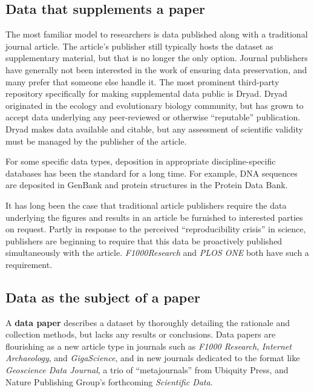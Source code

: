 \documentclass[10pt,a4paper,twocolumn]{article}
\begin{document}
\subsection*{Data that supplements a paper}\label{paper-supplement-data}

The most familiar model to researchers is data published along with a traditional journal article. 
The article's publisher still typically hosts the dataset as supplementary material, but that is no longer the only option.
Journal publishers have generally not been interested in the work of ensuring data preservation, and many prefer that someone else handle it.
The most prominent third-party repository specifically for making supplemental data public is Dryad\cite{dryad}.
Dryad originated in the ecology and evolutionary biology community, but has grown to accept data underlying any peer-reviewed or otherwise ``reputable'' publication. Dryad makes data available and citable, but any assessment of scientific validity must be managed by the publisher of the article. 

For some specific data types, deposition in appropriate discipline-specific databases has been the standard for a long time. 
For example, DNA sequences are deposited in GenBank\cite{genbank} and protein structures in the Protein Data Bank\cite{protein_data_bank}.

It has long been the case that traditional article publishers require the data underlying the figures and results in an article be furnished to interested parties on request.
Partly in response to the perceived ``reproducibility crisis'' in science, publishers are beginning to require that this data be proactively published simultaneously with the article.  
\emph{F1000Research} and \emph{PLOS ONE} both have such a requirement.





\subsection*{Data as the subject of a paper}\label{paper-subject-data}

A \textbf{data paper} describes a dataset by thoroughly detailing the rationale and collection methods, but lacks any results or conclusions. 
Data papers are flourishing as a new article type in journals such as \emph{F1000 Research}\cite{f1000_research}, \emph{Internet Archaeology}\cite{internet_archaeology}, and \emph{GigaScience}\cite{gigascience}, and in new journals dedicated to the format like \emph{Geoscience Data Journal}\cite{geoscience_data_journal}, a trio of ``metajournals'' from Ubiquity Press\cite{ubiquity_press_metajournals}, and Nature Publishing Group's forthcoming \emph{Scientific Data}\cite{nature_scientific_data}.
\end{document}
